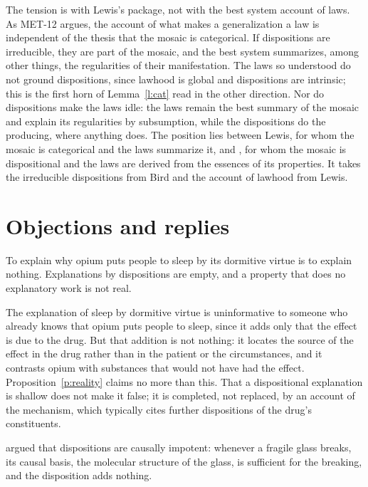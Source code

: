 \documentclass{situationist-preprint}
\begin{document}
The tension is with Lewis's package, not with the best system account of laws. As MET-12 argues, the account of what makes a generalization a law is independent of the thesis that the mosaic is categorical. If dispositions are irreducible, they are part of the mosaic, and the best system summarizes, among other things, the regularities of their manifestation. The laws so understood do not ground dispositions, since lawhood is global and dispositions are intrinsic; this is the first horn of Lemma~\ref{l:cat} read in the other direction. Nor do dispositions make the laws idle: the laws remain the best summary of the mosaic and explain its regularities by subsumption, while the dispositions do the producing, where anything does. The position lies between Lewis, for whom the mosaic is categorical and the laws summarize it, and \citet{Bird2007}, for whom the mosaic is dispositional and the laws are derived from the essences of its properties. It takes the irreducible dispositions from Bird and the account of lawhood from Lewis.

\section{Objections and replies}\label{s:objections}

\begin{objection}
To explain why opium puts people to sleep by its dormitive virtue is to explain nothing. Explanations by dispositions are empty, and a property that does no explanatory work is not real.
\end{objection}

\begin{reply}
The explanation of sleep by dormitive virtue is uninformative to someone who already knows that opium puts people to sleep, since it adds only that the effect is due to the drug. But that addition is not nothing: it locates the source of the effect in the drug rather than in the patient or the circumstances, and it contrasts opium with substances that would not have had the effect. Proposition~\ref{p:reality} claims no more than this. That a dispositional explanation is shallow does not make it false; it is completed, not replaced, by an account of the mechanism, which typically cites further dispositions of the drug's constituents.
\end{reply}

\begin{objection}
\citet{PPJ1982} argued that dispositions are causally impotent: whenever a fragile glass breaks, its causal basis, the molecular structure of the glass, is sufficient for the breaking, and the disposition adds nothing.
\end{objection}
\end{document}

